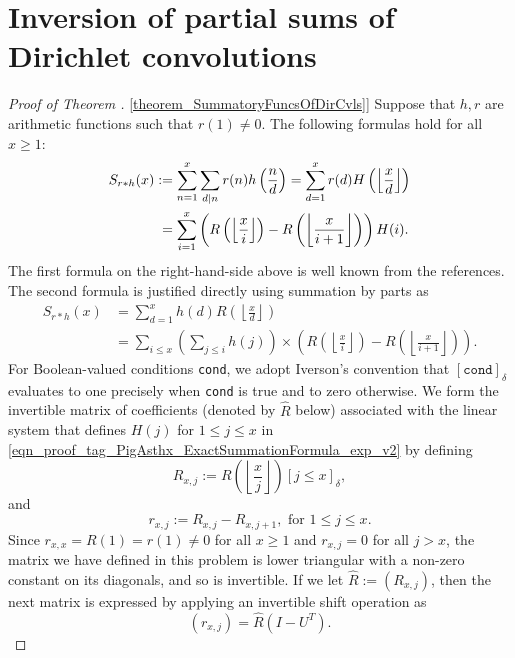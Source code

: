 \documentclass[11pt,reqno,a4letter]{article}
\newcommand{\hlocalref}[1]{\hyperref[#1]{\ref{#1}}}
\numberwithin{equation}{section}
\numberwithin{figure}{section}
\numberwithin{table}{section}
\newcommand{\Iverson}[1]{\ensuremath{\left[#1\right]_{\delta}}}
\newcommand{\floor}[1]{\left\lfloor #1 \right\rfloor}
\newcommand{\Floor}[2]{\ensuremath{\left\lfloor \frac{#1}{#2} \right\rfloor}}
\theoremstyle{plain}
\numberwithin{theorem}{section}
\theoremstyle{definition}
\begin{document}
\section{Inversion of partial sums of Dirichlet convolutions}
\label{Section_PrelimProofs_Config} 
\label{subSection_PrelimProofs_Config_InversionTheorem}

\begin{proof}[Proof of Theorem \hlocalref{theorem_SummatoryFuncsOfDirCvls}] 
\label{proofOf_theorem_SummatoryFuncsOfDirCvls} 
Suppose that $h,r$ are arithmetic functions such that $r(1) \neq 0$. 
The following formulas hold for all $x \geq 1$: 
\begin{align} 
\notag 
S_{r \ast h}(x) & := \sum_{n=1}^{x} \sum_{d|n} r(n) h\left(\frac{n}{d}\right) = 
     \sum_{d=1}^x r(d) H\left(\floor{\frac{x}{d}}\right) \\ 
\label{eqn_proof_tag_PigAsthx_ExactSummationFormula_exp_v2} 
     & \phantom{:} = 
     \sum_{i=1}^x \left(R\left(\floor{\frac{x}{i}}\right) - R\left(\floor{\frac{x}{i+1}}\right)\right) H(i). 
\end{align} 
The first formula on the right-hand-side above is well known from the references. 
The second formula is justified directly using 
summation by parts as \cite[\S 2.10(ii)]{NISTHB} 
\begin{align*} 
S_{r \ast h}(x) & = \sum_{d=1}^x h(d) R\left(\floor{\frac{x}{d}}\right) \\ 
     & = \sum_{i \leq x} \left(\sum_{j \leq i} h(j)\right) \times 
     \left(R\left(\floor{\frac{x}{i}}\right) - 
     R\left(\floor{\frac{x}{i+1}}\right)\right). 
\end{align*} 
For Boolean-valued conditions \texttt{cond}, we adopt Iverson's convention that 
$\Iverson{\mathtt{cond}}$ evaluates to one precisely when 
\texttt{cond} is true and to zero otherwise.
We form the invertible matrix of coefficients (denoted by $\hat{R}$ below) 
associated with the linear system that defines $H(j)$ for 
$1 \leq j \leq x$ in \eqref{eqn_proof_tag_PigAsthx_ExactSummationFormula_exp_v2} by defining
\[
R_{x,j} := R\left(\Floor{x}{j}\right) \Iverson{j \leq x}, 
\]
and 
\[
r_{x,j} := R_{x,j} - R_{x,j+1}, \text{ for } 1 \leq j \leq x. 
\] 
Since $r_{x,x} = R(1) = r(1) \neq 0$ for all $x \geq 1$ and $r_{x,j} = 0$ for all $j > x$, 
the matrix we have defined in this problem is lower triangular with a non-zero 
constant on its diagonals, and so is invertible. 
If we let $\hat{R} := (R_{x,j})$, then the next matrix is 
expressed by applying an invertible shift operation as 
\[
(r_{x,j}) = \hat{R} \left(I - U^{T}\right). 
\]
\end{proof}
\end{document}
